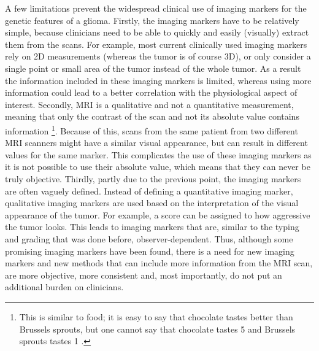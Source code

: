A few limitations prevent the widespread clinical use of imaging markers for the genetic features of a \gls{glioma}.
Firstly, the imaging markers have to be relatively simple, because clinicians need to be able to quickly and easily (visually) extract them from the scans.
For example, most current clinically used imaging markers rely on 2D measurements (whereas the \gls{tumor} is of course 3D), or only consider a single point or small area of the \gls{tumor} instead of the whole \gls{tumor}.
As a result the information included in these imaging markers is limited, whereas using more information could lead to a better correlation with the physiological aspect of interest.
Secondly, \gls{MRI} is a qualitative and not a quantitative measurement, meaning that only the contrast of the scan and not its absolute value contains information \footnote{This is similar to food; it is easy to say that chocolate tastes better than Brussels sprouts, but one cannot say that chocolate tastes 5  and Brussels sprouts tastes 1 .}.
Because of this, scans from the same patient from two different \gls{MRI} scanners might have a similar visual appearance, but can result in different values for the same marker.
This complicates the use of these imaging markers as it is not possible to use their absolute value, which means that they can never be truly objective.
Thirdly, partly due to the previous point, the imaging markers are often vaguely defined.
Instead of defining a quantitative imaging marker, qualitative imaging markers are used based on the interpretation of the visual appearance of the \gls{tumor}.
For example, a score can be assigned to how aggressive the \gls{tumor} looks.
This leads to imaging markers that are, similar to the typing and grading that was done before, observer-dependent.
Thus, although some promising imaging markers have been found, there is a need for new imaging markers and new methods that can include more information from the \gls{MRI} scan, are more objective, more consistent and, most importantly, do not put an additional burden on clinicians.

